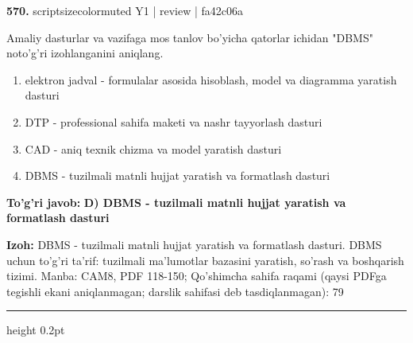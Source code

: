 \documentclass[10pt,a4paper]{article}
\begin{document}
{\bfseries\sffamily\color{ink} 570.} {scriptsizecolor{muted} Y1 | review | fa42c06a}
\par
Amaliy dasturlar va vazifaga mos tanlov bo'yicha qatorlar ichidan "DBMS" noto'g'ri izohlanganini aniqlang.
\begin{enumerate}[label=\Alph*),leftmargin=9mm]
\item elektron jadval - formulalar asosida hisoblash, model va diagramma yaratish dasturi
\item DTP - professional sahifa maketi va nashr tayyorlash dasturi
\item CAD - aniq texnik chizma va model yaratish dasturi
\item DBMS - tuzilmali matnli hujjat yaratish va formatlash dasturi
\end{enumerate}
\begin{tcolorbox}[enhanced,breakable,colback=teal!4,colframe=teal!60!black,boxrule=0.45pt,arc=1.2mm,left=2.7mm,right=2.7mm,top=1.8mm,bottom=1.8mm,before skip=2mm,after skip=2mm]
{\bfseries\sffamily\color{teal}To'g'ri javob:} \textbf{D) DBMS - tuzilmali matnli hujjat yaratish va formatlash dasturi}
\par\smallskip
{\bfseries Izoh:} DBMS - tuzilmali matnli hujjat yaratish va formatlash dasturi. DBMS uchun to'g'ri ta'rif: tuzilmali ma'lumotlar bazasini yaratish, so'rash va boshqarish tizimi. Manba: CAM8, PDF 118-150; Qo'shimcha sahifa raqami (qaysi PDFga tegishli ekani aniqlanmagan; darslik sahifasi deb tasdiqlanmagan): 79
\end{tcolorbox}
\vspace{2mm}\hrule height 0.2pt\vspace{3mm}
\end{document}

